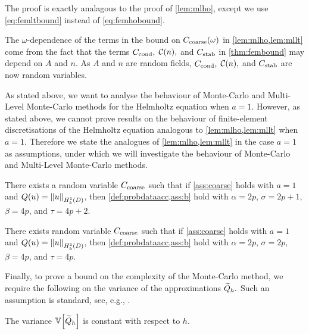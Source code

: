 The proof is exactly analagous to the proof of \cref{lem:mlho}, except we use \cref{eq:femltbound} instead of \cref{eq:femhobound}.
\epf

The $\omega$-dependence of the terms in the bound on $C_{\mathrm{coarse}}(\omega)$ in \cref{lem:mlho,lem:mllt} come from the fact that the terms $C_{\mathrm{cond}},$ $\mathcal C(n),$ and $C_{\mathrm{stab}}$ in \cref{thm:fembound} may depend on $A$ and $n$. As $A$ and $n$ are random fields, $C_{\mathrm{cond}},$ $\mathcal C(n),$ and $C_{\mathrm{stab}}$ are now random variables.
\ere

As stated above, we want to analyse the behaviour of Monte-Carlo and Multi-Level Monte-Carlo methods for the Helmholtz equation when $a=1.$ However, as stated above, we cannot prove results on the behaviour of finite-element discretisations of the Helmholtz equation analogous to \cref{lem:mlho,lem:mllt} when $a=1.$ Therefore we state the analogues of \cref{lem:mlho,lem:mllt} in the case $a=1$ as assumptions, under which we will investigate the behaviour of Monte-Carlo and Multi-Level Monte-Carlo methods.

\bas[Assumptions for $Q(u) = \NHokD{u}$ with $a=1$]\label{ass:mlho}
There exists a random variable $C_{\mathrm{coarse}}$ such that if \cref{ass:coarse} holds with $a = 1$ and $Q(u) = \NHokD{u}$, then \cref{def:probdataacc,ass:b} hold with $\alpha = 2p$, $\sigma = 2p+1,$ $\beta = 4p$, and $\tau = 4p+2$.
\eas

\bas[Assumptions for $Q(u) = \NLtD{u}$ with $a=1$]\label{ass:mllt}
There exists random variable $C_{\mathrm{coarse}}$ such that if \cref{ass:coarse} holds with $a = 1$ and $Q(u) = \NHokD{u}$, then \cref{def:probdataacc,ass:b} hold with $\alpha = 2p$, $\sigma = 2p,$ $\beta = 4p$, and $\tau = 4p$.
\eas

Finally, to prove a bound on the complexity of the Monte-Carlo method, we require the following  on the variance of the approximations $\widetilde{Q}_{h}.$ Such an assumption is standard, see, e.g., \cite[Text below equation (3)]{ClGiScTe:11}.

\label{ass:variance}
The variance $\VAR{\Qhtilde}$ is constant with respect to $h$.
\eas



